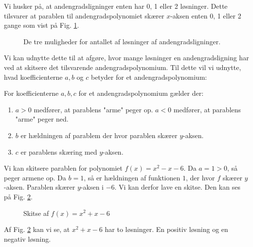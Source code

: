 Vi husker på, at andengradsligninger enten har 0, 1 eller 2 løsninger. Dette tilsvarer at parablen til andengradspolynomiet skærer $x$-aksen enten 0, 1 eller 2 gange som vist på Fig. \ref{fig:3parabler}.
\begin{figure}[H]
\center
{}
\caption{De tre muligheder for antallet af løsninger af andengradsligninger.}
\label{fig:3parabler}
\end{figure}
Vi kan udnytte dette til at afgøre, hvor mange løsninger en andengradsligning har ved at skitsere det tilsvarende andengradspolynomium. Til dette vil vi udnytte, hvad koefficienterne $a,b$ og $c$ betyder for et andengradspolynomium:
\begin{setn}
For koefficienterne $a,b,c$ for et andengradspolynomium gælder der:
\begin{enumerate}[label=\roman*)]
\item $a>0$ medfører, at parablens "arme" peger op. $a<0$ medfører, at parablens "arme" peger ned.
\item $b$ er hældningen af parablem der hvor parablen skærer $y$-aksen.
\item $c$ er parablens skæring med $y$-aksen. 
\end{enumerate}
\end{setn}
\begin{exa}
Vi kan skitsere parablen for polynomiet $f(x) = x^2-x-6$. Da $a=1>0$, så peger armene op. Da $b=1$, så er hældningen af funktionen $1$, der hvor $f$ skærer $y$-aksen. Parablen skærer $y$-aksen i $-6$. Vi kan derfor lave en skitse. Den kan ses på Fig. \ref{fig:parabelskitse}.
\begin{figure}[H]
\center
{}
\caption{Skitse af $f(x) = x^2+x-6$}
\label{fig:parabelskitse}
\end{figure}
Af Fig. \ref{fig:parabelskitse} kan vi se, at $x^2+x-6$ har to løsninger. En positiv løsning og en negativ løsning. 
\end{exa}
